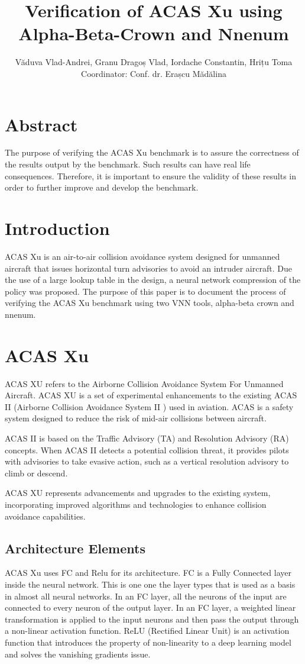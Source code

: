 \documentclass{article}
\title{Verification of ACAS Xu using Alpha-Beta-Crown and Nnenum }
\author{Văduva Vlad-Andrei, Granu Dragoș Vlad, Iordache Constantin, Hrițu Toma\\[1cm]{\small Coordinator: Conf. dr. Erașcu Mădălina}}
\begin{document}
\maketitle
\newpage
\tableofcontents
\clearpage
\section{Abstract}
The purpose of verifying the ACAS Xu benchmark is to assure the correctness of the results output by the benchmark. Such results can have real life consequences. Therefore, it is important to ensure the validity of these results in order to further improve and develop the benchmark.

\section{Introduction}
ACAS Xu\cite{vnn} is an air-to-air collision avoidance system designed for unmanned aircraft that issues horizontal turn advisories to avoid an intruder aircraft. Due the use of a large lookup table in the design, a neural network compression of the policy was proposed. The purpose of this paper is to document the process of verifying the ACAS Xu benchmark using two VNN tools, alpha-beta crown and nnenum.

\section{ACAS Xu}
ACAS XU\cite{acasxu} refers to the Airborne Collision Avoidance System For Unmanned Aircraft. ACAS XU is a set of experimental enhancements to the existing ACAS II (Airborne Collision Avoidance System II ) used in aviation. ACAS is a safety system designed to reduce the risk of mid-air collisions between aircraft.

ACAS II is based on the Traffic Advisory (TA) and Resolution Advisory (RA) concepts. When ACAS II detects a potential collision threat, it provides pilots with advisories to take evasive action, such as a vertical resolution advisory to climb or descend.

ACAS XU represents advancements and upgrades to the existing system, incorporating improved algorithms and technologies to enhance collision avoidance capabilities. 

\subsection{Architecture Elements}
ACAS Xu uses FC and Relu for its architecture.\newline
FC is a Fully Connected layer inside the neural network. This is one one the layer types that is used as a basis in almost all neural networks. In an FC layer, all the neurons of the input are connected to every neuron of the output layer. In an FC layer, a weighted linear transformation is applied to the input neurons and then pass the output through a non-linear activation function.
\newline
ReLU\cite{relu} (Rectified Linear Unit) is an activation function that introduces the property of non-linearity to a deep learning model and solves the vanishing gradients issue.
\newpage
\end{document}
